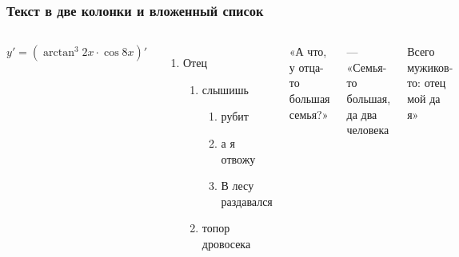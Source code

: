 \documentclass{beamer}
\begin{document}
\begin{frame}
    \frametitle{Текст в две колонки и вложенный список}
    \begin{columns}
    

    \(y' = {\left({\arctan^{3} {2x} \cdot \cos{8x} }\right)'} \)

    \begin{enumerate} %
        \item Отец
        \begin{enumerate}
            \item  слышишь
            \begin{enumerate}
                \item рубит
       			\item а я отвожу
                    \item В лесу раздавался
            \end{enumerate}
            \item  топор дровосека
        \end{enumerate}
        
    \end{enumerate}
    
    «А что, у отца-то большая семья?»
    
    — «Семья-то большая, да два человека
    
    Всего мужиков-то: отец мой да я»
    
    \end{columns}
\end{frame}
\end{document}
